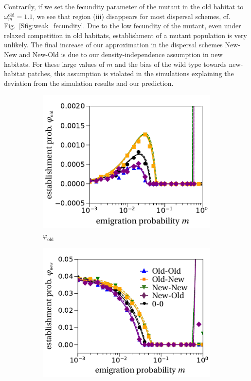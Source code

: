 \documentclass[a4paper,11pt]{scrartcl}
\newcommand{\chg}[1]{\textcolor{change}{#1}}
\begin{document}
\chg{Contrarily, if we set the fecundity parameter of the mutant in the old habitat to $\omega^\text{old}_m=1.1$, we see that region (iii) disappears for most dispersal schemes, cf. Fig.~\ref{Sfig:weak_fecundity}. Due to the low fecundity of the mutant, even under relaxed competition in old habitats, establishment of a mutant population is very unlikely. The final increase of our approximation in the dispersal schemes New-New and New-Old is due to our density-independence assumption in new habitats. For these large values of $m$ and the bias of the wild type towards new-habitat patches, this assumption is violated in the simulations explaining the deviation from the simulation results and our prediction. }

\begin{figure}
	\centering
	 	\begin{subfigure}{.5\textwidth}
  		\centering
  		\includegraphics[width=\linewidth]{figS2a.pdf}
  		\caption{$\varphi_{\text{old}}$}
	\end{subfigure}%
	\begin{subfigure}{.5\textwidth}
 		 \centering
 		 \includegraphics[width=\linewidth]{figS2b.pdf}

\end{subfigure}
\end{figure}
\end{document}
